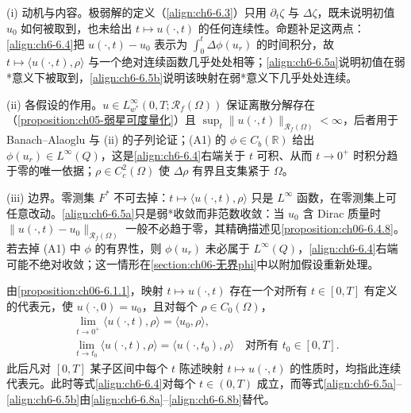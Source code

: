 \documentclass[../../main.tex]{subfiles}%
\begin{document}
\begin{remark}\label{remark:ch06-6.1.1动机}
(i) 动机与内容。极弱解的定义（\eqref{align:ch6-6.3}）只用 $\partial_t\zeta$ 与 $\Delta\zeta$，既未说明初值 $u_0$ 如何被取到，也未给出 $t\mapsto u(\cdot,t)$ 的任何连续性。命题补足这两点：\eqref{align:ch6-6.4}把 $u(\cdot,t)-u_0$ 表示为 $\int_0^t\Delta\phi(u_r)$ 的时间积分，故 $t\mapsto\langle u(\cdot,t),\rho\rangle$ 与一个绝对连续函数几乎处处相等；\eqref{align:ch6-6.5a}说明初值在弱*意义下被取到，\eqref{align:ch6-6.5b}说明该映射在弱*意义下几乎处处连续。

(ii) 各假设的作用。$u\in L^\infty_{w^*}(0,T;\mathscr{R}_f(\Omega))$ 保证离散分解存在（\cref{proposition:ch05-弱星可度量化}）且 $\sup_t\|u(\cdot,t)\|_{\mathscr{R}_f(\Omega)}<\infty$，后者用于 Banach--Alaoglu 与 (ii) 的子列论证；(A1) 的 $\phi\in C_b(\mathbb{R})$ 给出 $\phi(u_r)\in L^\infty(Q)$，这是\eqref{align:ch6-6.4}右端关于 $t$ 可积、从而 $t\to0^+$ 时积分趋于零的唯一依据；$\rho\in C^2_c(\Omega)$ 使 $\Delta\rho$ 有界且支集紧于 $\Omega$。

(iii) 边界。零测集 $F^*$ 不可去掉：$t\mapsto\langle u(\cdot,t),\rho\rangle$ 只是 $L^\infty$ 函数，在零测集上可任意改动。\eqref{align:ch6-6.5a}只是弱*收敛而非范数收敛：当 $u_0$ 含 Dirac 质量时 $\|u(\cdot,t)-u_0\|_{\mathscr{R}_f(\Omega)}$ 一般不必趋于零，其精确描述见\cref{proposition:ch06-6.4.8}。若去掉 (A1) 中 $\phi$ 的有界性，则 $\phi(u_r)$ 未必属于 $L^\infty(Q)$，\eqref{align:ch6-6.4}右端可能不绝对收敛；这一情形在\cref{section:ch06-无界phi}中以附加假设重新处理。
\end{remark}
\begin{remark}\label{remark:ch06-6.1.2}
由\cref{proposition:ch06-6.1.1}，映射 $t\mapsto u(\cdot,t)$ 存在一个对所有 $t\in[0,T]$ 有定义的代表元，使 $u(\cdot,0)=u_0$，且对每个 $\rho\in C_0(\Omega)$，
\begin{align}
\lim_{t\to0^+}\langle u(\cdot,t),\rho\rangle=\langle u_0,\rho\rangle, \label{align:ch6-6.8a}\\
\lim_{t\to t_0}\langle u(\cdot,t),\rho\rangle=\langle u(\cdot,t_0),\rho\rangle
\quad\text{对所有 }t_0\in[0,T]. \label{align:ch6-6.8b}
\end{align}
此后凡对 $[0,T]$ 某子区间中每个 $t$ 陈述映射 $t\mapsto u(\cdot,t)$ 的性质时，均指此连续代表元。此时等式\eqref{align:ch6-6.4}对每个 $t\in(0,T)$ 成立，而等式\eqref{align:ch6-6.5a}--\eqref{align:ch6-6.5b}由\eqref{align:ch6-6.8a}--\eqref{align:ch6-6.8b}替代。
\end{remark}
\end{document}
